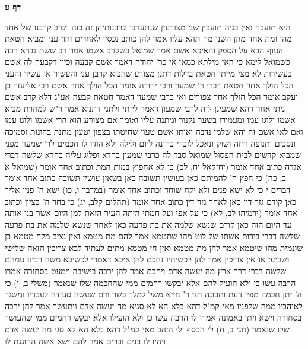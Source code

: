\documentclass[12pt, openany]{book}
\newcommand{\sethebfont}{
\fontsize{10.5pt}{21.0pt} \selectfont
}
\newcommand{\twocol}[1]{
	{\sethebfont \begin{multicols}{2}
			#1
	\end{multicols}}	
}
\newcommand{\sectname}{}
\newcommand{\newsection}[1]{
	\addcontentsline{toc}{section}{#1}
	\renewcommand{\sectname}{#1}	
	\vspace{-\baselineskip}
	\begin{center}
		\textbf{%
\fontsize{16pt}{16pt}\selectfont
			#1}
	\end{center}
	\vspace{-\baselineskip}
	\nopagebreak
}
\begin{document}
\newsection{דף ע}
\twocol{היא תועבה ואין בניה תועבין 
שני מצורעין שנתערבו קרבנותיהן זה בזה וקרב קרבנו של אחד מהן ומת אחד מהן השני מה תהא עליו 
אמר להן  כותב נכסיו לאחרים והוי עני ומביא חטאת העוף הבא על הספק 
והאיכא אשם  אמר שמואל  כשקרב אשמו 
אמר רב ששת  גברא רבה כשמואל לימא כי האי מילתא  כמאן אי כר' יהודה דאמר אשם קבעה וכיון דקבעה לה אשם בעשירות לא מצי מייתי חטאת בדלות 
דתנן  מצורע שהביא קרבן עני והעשיר או עשיר והעני הכל הולך אחר חטאת דברי ר' שמעון 
ורבי יהודה אומר  הכל הולך אחר אשם  רבי אליעזר בן יעקב אומר  הכל הולך אחר צפורים 
ואי כרבי שמעון דאמר חטאת קבעה אע"ג דלא קרב אשם ניתי אחר  דהא שמעינן ליה לרבי שמעון דאמר לייתי ולתני 
דתניא אמר ר"ש  למחרת מביא אשמו ולוגו עמו ומעמידו בשער נקנור ומתנה עליו ואומר אם מצורע הוא הרי אשמו ולוגו עמו  ואם לאו אשם זה יהא שלמי נדבה 
ואותו אשם טעון
שחיטתו בצפון וטעון מתנת בהונות וסמיכה ונסכים ותנופה וחזה ושוק ונאכל לזכרי כהונה ליום ולילה 
ולא הודו לו חכמים לר' שמעון מפני שמביא קדשים לבית הפסול 
שמואל סבר לה כרבי שמעון בחדא ופליג עליה בחדא
שלשה דברי אגדה  כתוב אחד אומר (יחזקאל יח, לב) כי לא אחפוץ במות המת וכתוב אחד אומר (שמואל א ב, כה) כי חפץ ה' להמיתם  כאן בעושין תשובה כאן בשאין עושין תשובה 
כתוב אחד אומר {דברים י } כי לא ישא פנים ולא יקח שוחד וכתוב אחד אומר (במדבר ו, כו) ישא ה' פניו אליך  כאן קודם גזר דין כאן לאחר גזר דין 
כתוב אחד אומר (תהלים קלב, יג) כי בחר ה' בציון וכתוב אחד אומר (ירמיהו לב, לא) כי על אפי ועל חמתי היתה העיר הזאת למן היום אשר בנו אותה עד היום הזה  כאן קודם שנשא שלמה את בת פרעה כאן לאחר שנשא שלמה את בת פרעה
שלשה דברי בורות  אשתו של לוט מהו שתטמא  אמר להם  מת מטמא ואין נציב מלח מטמא 
בן שונמית מהו שיטמא  אמר להן  מת מטמא ואין חי מטמא 
מתים לעתיד לבא צריכין הזאה שלישי ושביעי או אין צריכין  אמר להן  לכשיחיו נחכם להן  איכא דאמרי  לכשיבא משה רבינו עמהם
שלשה דברי דרך ארץ  מה יעשה אדם ויחכם  אמר להן  ירבה בישיבה וימעט בסחורה  אמרו  הרבה עשו כן ולא הועיל להם  אלא  יבקשו רחמים ממי שהחכמה שלו שנאמר (משלי ב, ו) כי ה' יתן חכמה מפיו דעת ותבונה 
תני ר' חייא  משל למלך בשר ודם שעשה סעודה לעבדיו ומשגר לאוהביו ממה שלפניו 
מאי קמ"ל  דהא בלא הא לא סגיא 
מה יעשה אדם ויתעשר  אמר להן  ירבה בסחורה וישא ויתן באמונה  אמרו לו  הרבה עשו כן ולא הועילו  אלא יבקש רחמים ממי שהעושר שלו  שנאמר (חגי ב, ח) לי הכסף ולי הזהב 
מאי קמ"ל  דהא בלא הא לא סגי
מה יעשה אדם ויהיו לו בנים זכרים  אמר להם  ישא אשה ההוגנת לו}
\end{document}

